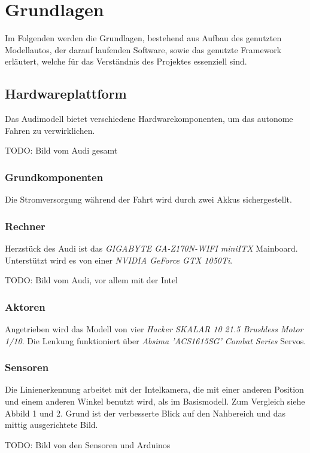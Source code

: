 \documentclass[12pt, a4paper]{scrartcl}
\begin{document}
\newpage
\section{Grundlagen}

Im Folgenden werden die Grundlagen, bestehend aus Aufbau des genutzten Modellautos, der darauf laufenden Software, sowie das genutzte Framework erläutert, welche für das Verständnis des Projektes essenziell sind.

\subsection{Hardwareplattform}

Das Audimodell bietet verschiedene Hardwarekomponenten, um das autonome Fahren zu verwirklichen.

TODO: Bild vom Audi gesamt

\subsubsection{Grundkomponenten}
Die Stromversorgung während der Fahrt wird durch zwei Akkus sichergestellt.

\subsubsection{Rechner}
Herzstück des Audi ist das \emph{GIGABYTE GA-Z170N-WIFI miniITX} Mainboard. Unterstützt wird es von einer \emph{NVIDIA GeForce GTX 1050Ti}. 

TODO: Bild vom Audi, vor allem mit der Intel

\subsubsection{Aktoren}
Angetrieben wird das Modell von vier \emph{Hacker SKALAR 10 21.5 Brushless Motor 1/10}.
Die Lenkung funktioniert über \emph{Absima 'ACS1615SG' Combat Series} Servos. 

\subsubsection{Sensoren}
Die Linienerkennung arbeitet mit der Intelkamera, die mit einer anderen Position und einem anderen Winkel benutzt wird, als im Basismodell. Zum Vergleich siehe Abbild 1 und 2. Grund ist der verbesserte Blick auf den Nahbereich und das mittig ausgerichtete Bild.

TODO: Bild von den Sensoren und Arduinos
\end{document}
